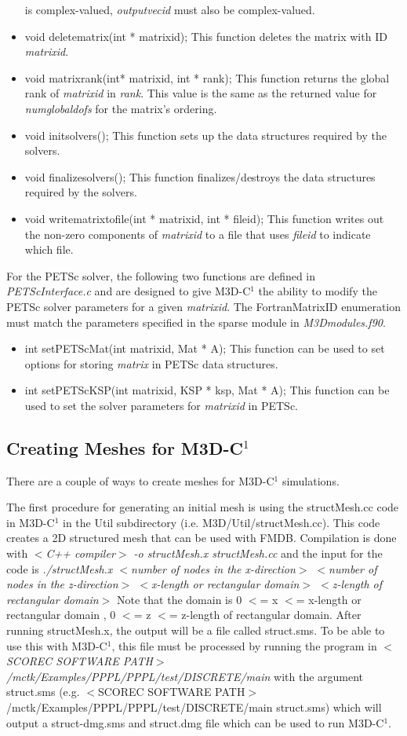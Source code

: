 \begin{itemize}
is complex-valued, \textit{outputvecid} must also be complex-valued.
\item  void deletematrix(int * matrixid);  This function deletes the matrix with ID \textit{matrixid}.
\item  void matrixrank(int* matrixid, int * rank);  This function returns the global rank of \textit{matrixid}
in \textit{rank}.  This value is the same as the returned value for \textit{numglobaldofs} for the matrix's
ordering.
\item  void initsolvers();  This function sets up the data structures required by the solvers.
\item  void finalizesolvers();  This function finalizes/destroys the data structures required by the solvers.
\item  void writematrixtofile(int * matrixid, int * fileid);  This function writes out the non-zero components
of \textit{matrixid} to a file that uses \textit{fileid} to indicate which file.
\end{itemize}
For the PETSc solver, the following two functions are defined in \textit{PETScInterface.c} and are designed
to give M3D-C$^1$ the ability to modify the PETSc solver parameters for a given \textit{matrixid}.  
The FortranMatrixID enumeration must match the parameters specified in the sparse module in \textit{M3Dmodules.f90}.
\begin{itemize}
\item  int setPETScMat(int matrixid, Mat * A);  This function can be used to set options for storing \textit{matrix}
in PETSc data structures.
\item int setPETScKSP(int matrixid, KSP * ksp, Mat * A); This function can be used to set the solver
parameters for \textit{matrixid} in PETSc.
\end{itemize}

\subsection{Creating Meshes for M3D-C$^1$}
There are a couple of ways to create meshes for M3D-C$^1$ simulations.  

The first procedure for generating an initial mesh is using the 
structMesh.cc code in 
M3D-C$^1$ in the Util subdirectory (i.e. M3D/Util/structMesh.cc).  This code
 creates a 2D structured mesh that can be used with FMDB.  Compilation is done with
 \textit{$<$C++ compiler$>$ -o structMesh.x structMesh.cc} and the input for the code is
\textit{./structMesh.x $<$number of nodes in the x-direction$>$ $<$number of nodes in the z-direction$>$ 
$<$x-length or rectangular domain$>$ $<$z-length of rectangular domain$>$}
Note that the domain is 0 $<$= x $<$= x-length or rectangular domain , 0 $<$= z $<$= z-length of rectangular domain.
After running structMesh.x, the output will be a file called struct.sms.  To be
able to use this with M3D-C$^1$, this file must be processed by running the program
in \textit{$<$SCOREC SOFTWARE PATH$>$/mctk/Examples/PPPL/PPPL/test/DISCRETE/main} with the argument struct.sms 
(e.g. $<$SCOREC SOFTWARE PATH$>$/mctk/Examples/PPPL/PPPL/test/DISCRETE/main struct.sms)
which will output a struct-dmg.sms and struct.dmg file which can be used to
run M3D-C$^{1}$.

